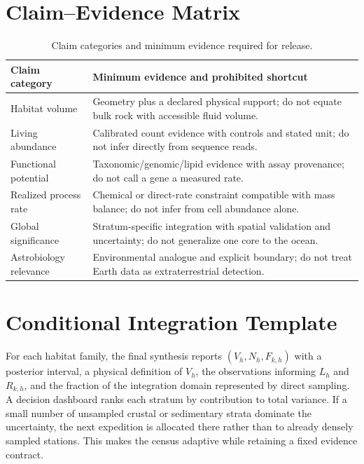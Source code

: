 \documentclass[conference]{../../../../Conference-LaTeX-template_10-17-19/IEEEtran}
\begin{document}
\section{Claim--Evidence Matrix}
\begin{table}[h]
\caption{Claim categories and minimum evidence required for release.}
\label{tab:claim-evidence}
\centering
\footnotesize
\begin{tabularx}{\columnwidth}{@{}p{}Y@{}}
\toprule
\textbf{Claim category} & \textbf{Minimum evidence and prohibited shortcut} \\
\midrule
Habitat volume & Geometry plus a declared physical support; do not equate bulk rock with accessible fluid volume. \\
Living abundance & Calibrated count evidence with controls and stated unit; do not infer directly from sequence reads. \\
Functional potential & Taxonomic/genomic/lipid evidence with assay provenance; do not call a gene a measured rate. \\
Realized process rate & Chemical or direct-rate constraint compatible with mass balance; do not infer from cell abundance alone. \\
Global significance & Stratum-specific integration with spatial validation and uncertainty; do not generalize one core to the ocean. \\
Astrobiology relevance & Environmental analogue and explicit boundary; do not treat Earth data as extraterrestrial detection. \\
\bottomrule
\end{tabularx}
\end{table}

\section{Conditional Integration Template}
For each habitat family, the final synthesis reports $(V_h,N_h,F_{k,h})$ with a posterior interval, a physical definition of $V_h$, the observations informing $L_h$ and $R_{k,h}$, and the fraction of the integration domain represented by direct sampling. A decision dashboard ranks each stratum by contribution to total variance. If a small number of unsampled crustal or sedimentary strata dominate the uncertainty, the next expedition is allocated there rather than to already densely sampled stations. This makes the census adaptive while retaining a fixed evidence contract.
\end{document}
